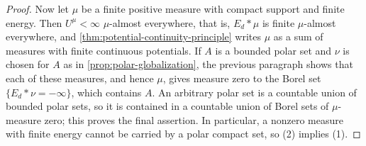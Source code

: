\begin{proof}
Now let $\mu$ be a finite positive measure with compact support and finite energy. Then $U^\mu<\infty$ $\mu$-almost everywhere, that is, $E_d*\mu$ is finite $\mu$-almost everywhere, and \cref{thm:potential-continuity-principle} writes $\mu$ as a sum of measures with finite continuous potentials. If $A$ is a bounded polar set and $\nu$ is chosen for $A$ as in \cref{prop:polar-globalization}, the previous paragraph shows that each of these measures, and hence $\mu$, gives measure zero to the Borel set $\{E_d*\nu=-\infty\}$, which contains $A$. An arbitrary polar set is a countable union of bounded polar sets, so it is contained in a countable union of Borel sets of $\mu$-measure zero; this proves the final assertion. In particular, a nonzero measure with finite energy cannot be carried by a polar compact set, so (2) implies (1).
\end{proof}

